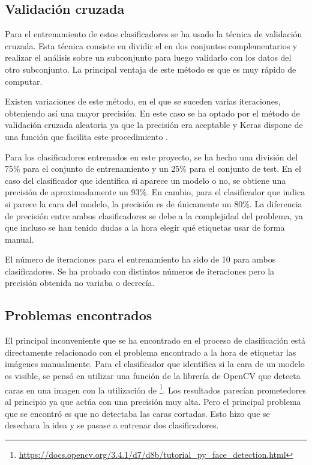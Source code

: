 \subsection{Validación cruzada}
Para el entrenamiento de estos clasificadores se ha usado la técnica de validación cruzada. Esta técnica consiste en dividir el  en dos conjuntos complementarios y realizar el análisis sobre un subconjunto para luego validarlo con los datos del otro subconjunto. La principal ventaja de este método es que es muy rápido de computar.

Existen variaciones de este método, en el que se suceden varias iteraciones, obteniendo así una mayor precisión. En este caso se ha optado por el método de validación cruzada aleatoria ya que la precisión era aceptable y Keras dispone de una función que facilita este procedimiento \cite{wiki:cruzada}. 


Para los clasificadores entrenados en este proyecto, se ha hecho una división del 75\% para el conjunto de entrenamiento y un 25\% para el conjunto de test. En el caso del clasificador que identifica si aparece un modelo o no, se obtiene una precisión de aproximadamente un 93\%. En cambio, para el clasificador que indica si parece la cara del modelo, la precisión es de únicamente un 80\%. La diferencia de precisión entre ambos clasificadores se debe a la complejidad del problema, ya que incluso se han tenido dudas a la hora elegir qué etiquetas usar de forma manual.


El número de iteraciones para el entrenamiento ha sido de 10 para ambos clasificadores. Se ha probado con distintos números de iteraciones pero la precisión obtenida no variaba o decrecía.


\subsection{Problemas encontrados}

El principal inconveniente que se ha encontrado en el proceso de clasificación está directamente relacionado con el problema encontrado a la hora de etiquetar las imágenes manualmente. Para el clasificador que identifica si la cara de un modelo es visible, se pensó en utilizar una función de la librería de OpenCV que detecta caras en una imagen con la utilización de \footnote{\url{https://docs.opencv.org/3.4.1/d7/d8b/tutorial_py_face_detection.html}}. Los resultados parecían prometedores al principio ya que actúa con una precisión muy alta. Pero el principal problema que se encontró es que no detectaba las caras cortadas. Esto hizo que se desechara la idea y se pasase a entrenar dos clasificadores.

